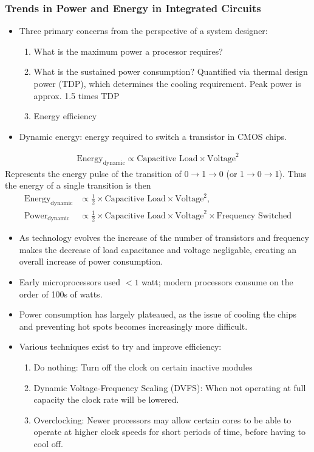 \subsubsection{Trends in Power and Energy in Integrated Circuits}
\begin{itemize}
    \item Three primary concerns from the perspective of a system designer:
    \begin{enumerate}
        \item What is the maximum power a processor requires?
        \item What is the sustained power consumption? Quantified via thermal design power (TDP), which determines the cooling requirement. Peak power is approx. 1.5 times TDP
        \item Energy efficiency
    \end{enumerate}
    \item Dynamic energy: energy required to switch a transistor in CMOS chips.
\end{itemize}
\begin{align*}
    \text{Energy}_{\text{dynamic}} \propto \text{Capacitive Load} \times \text{Voltage}^2
\end{align*}
Represents the energy pulse of the transition of 0$\rightarrow$1$\rightarrow$0 (or 1$\rightarrow$0$\rightarrow$1). Thus the energy of a single transition is then
\begin{align*}
    \text{Energy}_{\text{dynamic}} &\propto \frac{1}{2} \times \text{Capacitive Load} \times \text{Voltage}^2, \\
    \text{Power}_{\text{dynamic}} &\propto \frac{1}{2} \times \text{Capacitive Load} \times \text{Voltage}^2 \times \text{Frequency Switched}
\end{align*}
\begin{itemize}
    \item As technology evolves the increase of the number of transistors and frequency makes the decrease of load capacitance and voltage negligable, creating an overall increase of power consumption.
    \item Early microprocessors used $<1$ watt; modern processors consume on the order of 100s of watts.
    \item Power consumption has largely plateaued, as the issue of cooling the chips and preventing hot spots becomes increasingly more difficult.
    \item Various techniques exist to try and improve efficiency:
    \begin{enumerate}
        \item Do nothing: Turn off the clock on certain inactive modules
        \item Dynamic Voltage-Frequency Scaling (DVFS): When not operating at full capacity the clock rate will be lowered.
        \item Overclocking: Newer processors may allow certain cores to be able to operate at higher clock speeds for short periods of time, before having to cool off.
    \end{enumerate}
\end{itemize}
